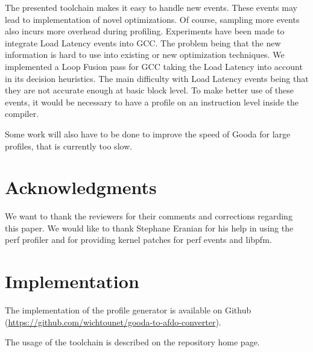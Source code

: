 \documentclass[9pt,english,twocolumn,letter]{article}
\begin{document}
The presented toolchain makes it easy to handle new events. These events may lead to implementation of novel optimizations. Of course, sampling more events also incurs more overhead during profiling. Experiments have been made to integrate Load Latency events into GCC. The problem being that the new information is hard to use into existing or new optimization techniques. We implemented a Loop Fusion pass for GCC taking the Load Latency into account in its decision heuristics\cite{Wicht2013}. The main difficulty with Load Latency events being that they are not accurate enough at basic block level. To make better use of these events, it would be necessary to have a profile on an instruction level inside the compiler.

Some work will also have to be done to improve the speed of Gooda for large profiles, that is currently too slow.

\section{Acknowledgments}

We want to thank the reviewers for their comments and corrections regarding this paper. We would like to thank Stephane Eranian for his help in using the perf profiler and for providing kernel patches for perf events and libpfm.

\appendix
\section{Implementation}

The implementation of the profile generator is available on Github (\url{https://github.com/wichtounet/gooda-to-afdo-converter}).

The usage of the toolchain is described on the repository home page.



\end{document}
